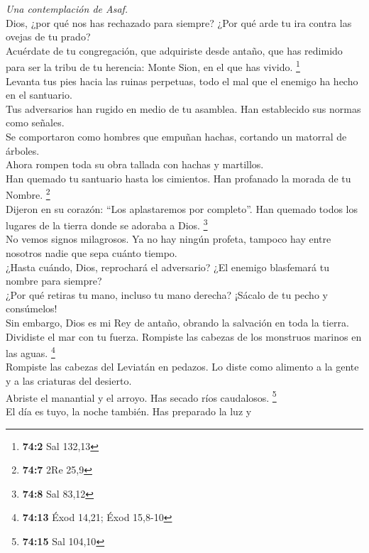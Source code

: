 \emph{Una contemplación de Asaf.}\\
 Dios, ¿por qué nos has rechazado para siempre? ¿Por qué
arde tu ira contra las ovejas de tu prado?\\
 Acuérdate de tu congregación, que adquiriste desde
antaño, que has redimido para ser la tribu de tu herencia: Monte Sion,
en el que has vivido. \footnote{\textbf{74:2} Sal 132,13}\\
 Levanta tus pies hacia las ruinas perpetuas, todo el mal
que el enemigo ha hecho en el santuario.\\
 Tus adversarios han rugido en medio de tu asamblea. Han
establecido sus normas como señales.\\
 Se comportaron como hombres que empuñan hachas, cortando
un matorral de árboles.\\
 Ahora rompen toda su obra tallada con hachas y
martillos.\\
 Han quemado tu santuario hasta los cimientos. Han
profanado la morada de tu Nombre. \footnote{\textbf{74:7} 2Re 25,9}\\
 Dijeron en su corazón: ``Los aplastaremos por completo''.
Han quemado todos los lugares de la tierra donde se adoraba a Dios.
\footnote{\textbf{74:8} Sal 83,12}\\
 No vemos signos milagrosos. Ya no hay ningún profeta,
tampoco hay entre nosotros nadie que sepa cuánto tiempo.\\
 ¿Hasta cuándo, Dios, reprochará el adversario? ¿El
enemigo blasfemará tu nombre para siempre?\\
 ¿Por qué retiras tu mano, incluso tu mano derecha?
¡Sácalo de tu pecho y consúmelos!\\
 Sin embargo, Dios es mi Rey de antaño, obrando la
salvación en toda la tierra.\\
 Dividiste el mar con tu fuerza. Rompiste las cabezas de
los monstruos marinos en las aguas. \footnote{\textbf{74:13} Éxod 14,21;
  Éxod 15,8-10}\\
 Rompiste las cabezas del Leviatán en pedazos. Lo diste
como alimento a la gente y a las criaturas del desierto.\\
 Abriste el manantial y el arroyo. Has secado ríos
caudalosos. \footnote{\textbf{74:15} Sal 104,10}\\
 El día es tuyo, la noche también. Has preparado la luz y
